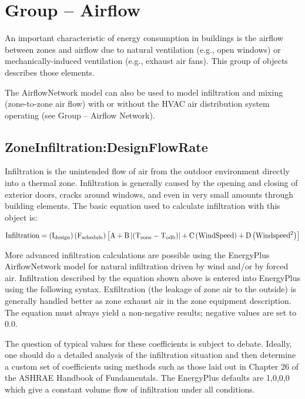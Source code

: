 \section{Group -- Airflow}\label{group-airflow}

An important characteristic of energy consumption in buildings is the airflow between zones and airflow due to natural ventilation (e.g., open windows) or mechanically-induced ventilation (e.g., exhaust air fans). This group of objects describes those elements.

The AirflowNetwork model can also be used to model infiltration and mixing (zone-to-zone air flow) with or without the HVAC air distribution system operating (see Group -- Airflow Network).

\subsection{ZoneInfiltration:DesignFlowRate}\label{zoneinfiltrationdesignflowrate}

Infiltration is the unintended flow of air from the outdoor environment directly into a thermal zone. Infiltration is generally caused by the opening and closing of exterior doors, cracks around windows, and even in very small amounts through building elements. The basic equation used to calculate infiltration with this object is:

\begin{equation}
  \rm{Infiltration} = \left( {{I_{design}}} \right)\left( {{F_{schedule}}} \right)\left[ {A + B\left| {\left( {{T_{zone}} - {T_{odb}}} \right)} \right| + C\left( {WindSpeed} \right) + D\left( {Windspee{d^2}} \right)} \right]
\end{equation}

More advanced infiltration calculations are possible using the EnergyPlus AirflowNetwork model for natural infiltration driven by wind and/or by forced air. Infiltration described by the equation shown above is entered into EnergyPlus using the following syntax. Exfiltration (the leakage of zone air to the outside) is generally handled better as zone exhaust air in the zone equipment description. The equation must always yield a non-negative results; negative values are set to 0.0.

The question of typical values for these coefficients is subject to debate. Ideally, one should do a detailed analysis of the infiltration situation and then determine a custom set of coefficients using methods such as those laid out in Chapter 26 of the ASHRAE Handbook of Fundamentals. The EnergyPlus defaults are 1,0,0,0 which give a constant volume flow of infiltration under all conditions.

